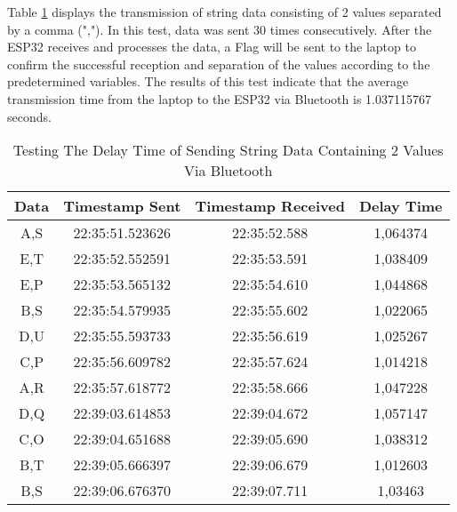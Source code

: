 Table \ref{tbl:delayBluetooth} displays the transmission of string data consisting of 2 values separated by a comma (","). In this test, data was sent 30 times consecutively. After the ESP32 receives and processes the data, a Flag will be sent to the laptop to confirm the successful reception and separation of the values according to the predetermined variables. The results of this test indicate that the average transmission time from the laptop to the ESP32 via Bluetooth is 1.037115767 seconds.

\begin{table}[!ht]
  \centering
  \caption{Testing The Delay Time of Sending String Data Containing 2 Values Via Bluetooth}
  \label{tbl:delayBluetooth}
  \begin{tabular}{|ccc|c|}
  \hline
  \multicolumn{1}{|c|}{Data} & \multicolumn{1}{c|}{Timestamp Sent}  & Timestamp Received & Delay Time  \\ \hline
  \multicolumn{1}{|c|}{A,S}  & \multicolumn{1}{c|}{22:35:51.523626} & 22:35:52.588       & 1,064374    \\ \hline
  \multicolumn{1}{|c|}{E,T}  & \multicolumn{1}{c|}{22:35:52.552591} & 22:35:53.591       & 1,038409    \\ \hline
  \multicolumn{1}{|c|}{E,P}  & \multicolumn{1}{c|}{22:35:53.565132} & 22:35:54.610       & 1,044868    \\ \hline
  \multicolumn{1}{|c|}{B,S}  & \multicolumn{1}{c|}{22:35:54.579935} & 22:35:55.602       & 1,022065    \\ \hline
  \multicolumn{1}{|c|}{D,U}  & \multicolumn{1}{c|}{22:35:55.593733} & 22:35:56.619       & 1,025267    \\ \hline
  \multicolumn{1}{|c|}{C,P}  & \multicolumn{1}{c|}{22:35:56.609782} & 22:35:57.624       & 1,014218    \\ \hline
  \multicolumn{1}{|c|}{A,R}  & \multicolumn{1}{c|}{22:35:57.618772} & 22:35:58.666       & 1,047228    \\ \hline
  \multicolumn{1}{|c|}{D,Q}  & \multicolumn{1}{c|}{22:39:03.614853} & 22:39:04.672       & 1,057147    \\ \hline
  \multicolumn{1}{|c|}{C,O}  & \multicolumn{1}{c|}{22:39:04.651688} & 22:39:05.690       & 1,038312    \\ \hline
  \multicolumn{1}{|c|}{B,T}  & \multicolumn{1}{c|}{22:39:05.666397} & 22:39:06.679       & 1,012603    \\ \hline
  \multicolumn{1}{|c|}{B,S}  & \multicolumn{1}{c|}{22:39:06.676370} & 22:39:07.711       & 1,03463     \\ \hline

\end{tabular}
\end{table}
